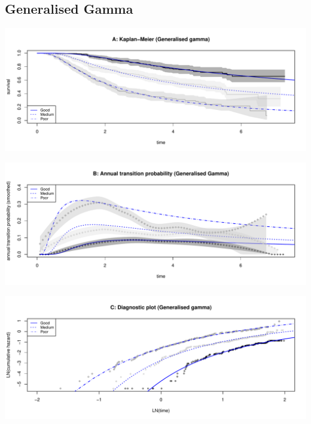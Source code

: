 \documentclass[
]{article}
\begin{document}
\clearpage

\hypertarget{generalised-gamma}{%
\subsection{Generalised Gamma}\label{generalised-gamma}}

\begin{flushleft}\includegraphics[height=0.25\textheight]{Images/ggam-1} \end{flushleft}

\begin{flushleft}\includegraphics[height=0.25\textheight]{Images/ggam-2} \end{flushleft}

\begin{flushleft}\includegraphics[height=0.25\textheight]{Images/ggam-3} \end{flushleft}
\end{document}
